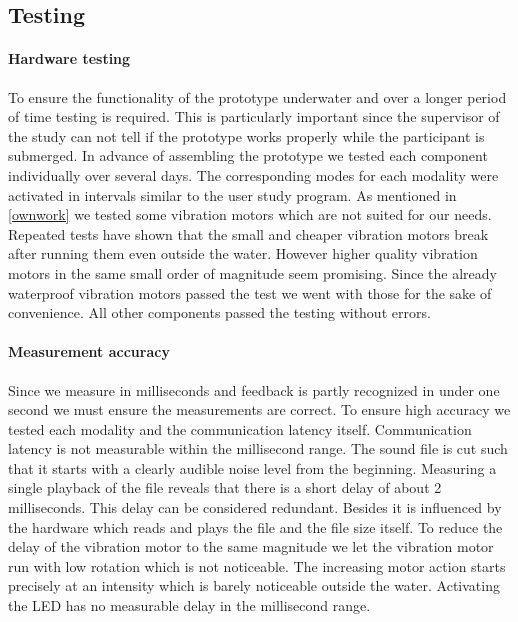 \subsection{Testing}
\paragraph{Hardware testing}
To ensure the functionality of the prototype underwater and over a longer period of time testing is required. 
This is particularly important since the supervisor of the study can not tell if the prototype works properly while the participant is submerged. 
In advance of assembling the prototype we tested each component individually over several days. 
The corresponding modes for each modality were activated in intervals similar to the user study program. 
As mentioned in \ref{ownwork} we tested some vibration motors which are not suited for our needs. 
Repeated tests have shown that the small and cheaper vibration motors break after running them even outside the water. 
However higher quality vibration motors in the same small order of magnitude seem promising. 
Since the already waterproof vibration motors passed the test we went with those for the sake of convenience. 
All other components passed the testing without errors.

\paragraph{Measurement accuracy}
Since we measure in milliseconds and feedback is partly recognized in under one second we must ensure the measurements are correct. To ensure high accuracy we tested each modality and the communication latency itself. Communication latency is not measurable within the millisecond range. 
The sound file is cut such that it starts with a clearly audible noise level from the beginning. Measuring a single playback of the file reveals that there is a short delay of about 2 milliseconds. 
This delay can be considered redundant. 
Besides it is influenced by the hardware which reads and plays the file and the file size itself. To reduce the delay of the vibration motor to the same magnitude we let the vibration motor run with low rotation which is not noticeable. The increasing motor action starts precisely at an intensity which is barely noticeable outside the water. Activating the LED has no measurable delay in the millisecond range.























